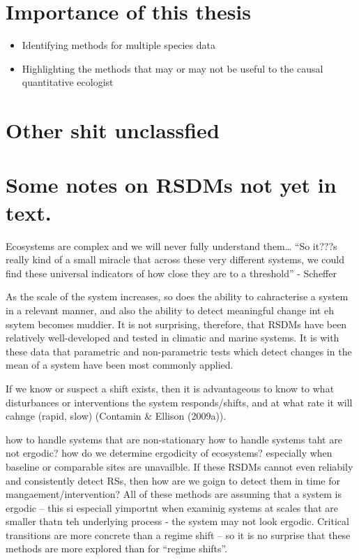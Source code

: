 \documentclass[12pt,twoside,openany]{reedthesis}
\providecommand{\tightlist}{%
  \setlength{\itemsep}{0pt}\setlength{\parskip}{0pt}}
\begin{document}
\section{Importance of this thesis}\label{importance-of-this-thesis}
\begin{itemize}
\tightlist
\item
  Identifying methods for multiple species data
\item
  Highlighting the methods that may or may not be useful to the causal
  quantitative ecologist
\end{itemize}
\section{Other shit unclassfied}\label{other-shit-unclassfied}

\section{Some notes on RSDMs not yet in
text.}\label{some-notes-on-rsdms-not-yet-in-text.}

Ecosystems are complex and we will never fully understand them\ldots{}
``So it???s really kind of a small miracle that across these very
different systems, we could find these universal indicators of how close
they are to a threshold'' - Scheffer

As the scale of the system increases, so does the ability to
cahracterise a system in a relevant manner, and also the ability to
detect meaningful change int eh ssytem becomes muddier. It is not
surprising, therefore, that RSDMs have been relatively well-developed
and tested in climatic and marine systems. It is with these data that
parametric and non-parametric tests which detect changes in the mean of
a system have been most commonly applied.

If we know or suspect a shift exists, then it is advantageous to know to
what disturbances or interventions the system responds/shifts, and at
what rate it will cahnge (rapid, slow) (Contamin \& Ellison (2009a)).

how to handle systems that are non-stationary how to handle systems taht
are not ergodic? how do we determine ergodicity of ecosystems?
especially when baseline or comparable sites are unavailble. If these
RSDMs cannot even reliabily and consistently detect RSs, then how are we
goign to detect them in time for mangaement/intervention? All of these
methods are assuming that a system is ergodic -- this si especiall
yimportnt when examinig systems at scales that are smaller thatn teh
underlying process - the system may not look ergodic. Critical
transitions are more concrete than a regime shift -- so it is no
surprise that these methods are more explored than for ``regime
shifts''.
\end{document}
